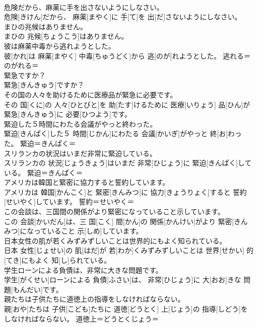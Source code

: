 \documentclass[8pt]{extreport}
\begin{document}
\begin{CJK}{UTF8}{min}
\\	危険だから、麻薬に手を出さないようにしなさい。	
\\	危険[きけん]だから、 麻薬[まやく]に 手[て]を 出[だ]さないようにしなさい。	
\\	まひの兆候はありません。	
\\	まひの 兆候[ちょうこう]はありません。	
\\	彼は麻薬中毒から逃れようとした。	
\\	彼[かれ]は 麻薬[まやく] 中毒[ちゅうどく]から 逃[のが]れようとした。	逃れる＝のがれる＝ 
\\	緊急ですか？	
\\	緊急[きんきゅう]ですか？	
\\	その国の人々を助けるために医療品が緊急に必要です。	
\\	その 国[くに]の 人々[ひとびと]を 助[たす]けるために 医療[いりょう] 品[ひん]が 緊急[きんきゅう]に 必要[ひつよう]です。	
\\	緊迫した５時間にわたる会議がやっと終わった。	
\\	緊迫[きんぱく]した５ 時間[じかん]にわたる 会議[かいぎ]がやっと 終[お]わった。	緊迫＝きんぱく＝ 
\\	スリランカの状況はいまだ非常に緊迫している。	
\\	スリランカの 状況[じょうきょう]はいまだ 非常[ひじょう]に 緊迫[きんぱく]している。	緊迫＝きんぱく＝ 
\\	アメリカは韓国と緊密に協力すると誓約しています。	
\\	アメリカは 韓国[かんこく]と 緊密[きんみつ]に 協力[きょうりょく]すると 誓約[せいやく]しています。	誓約＝せいやく＝ 
\\	この会談は、三国間の関係がより緊密になっていること示しています。	
\\	この 会談[かいだん]は、三 国[こく] 間[かん]の 関係[かんけい]がより 緊密[きんみつ]になっていること 示[しめ]しています。	
\\	日本女性の肌が若くみずみずしいことは世界的にもよく知られている。	
\\	日本 女性[じょせい]の 肌[はだ]が 若[わか]くみずみずしいことは 世界[せかい] 的[てき]にもよく 知[し]られている。	
\\	学生ローンによる負債は、非常に大きな問題です。	
\\	学生[がくせい]ローンによる 負債[ふさい]は、 非常[ひじょう]に 大[おお]きな 問題[もんだい]です。	
\\	親たちは子供たちに道徳上の指導をしなければならない。	
\\	親[おや]たちは 子供[こども]たちに 道徳[どうとく] 上[じょう]の 指導[しどう]をしなければならない。	道徳上＝どうとくじょう＝ 

\end{CJK}
\end{document}
